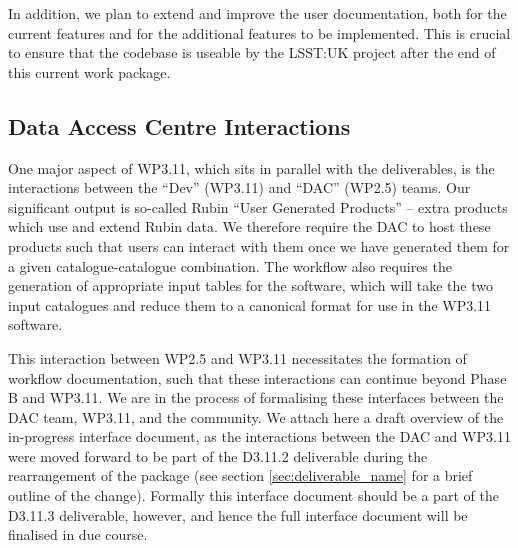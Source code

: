 \documentclass[a4paper,11pt]{scrartcl}
\begin{document}
In addition, we plan to extend and improve the user documentation, both for the current features and for the additional features to be implemented.
This is crucial to ensure that the codebase is useable by the LSST:UK project after the end of this current work package.

\subsection{Data Access Centre Interactions}
One major aspect of WP3.11, which sits in parallel with the deliverables, is the interactions between the ``Dev'' (WP3.11) and ``DAC'' (WP2.5) teams.
Our significant output is so-called Rubin ``User Generated Products'' -- extra products which use and extend Rubin data.
We therefore require the DAC to host these products such that users can interact with them once we have generated them for a given catalogue-catalogue combination.
The workflow also requires the generation of appropriate input tables for the software, which will take the two input catalogues and reduce them to a canonical format for use in the WP3.11 software.

This interaction between WP2.5 and WP3.11 necessitates the formation of workflow documentation, such that these interactions can continue beyond Phase B and WP3.11.
We are in the process of formalising these interfaces between the DAC team, WP3.11, and the community.
We attach here a draft overview of the in-progress interface document, as the interactions between the DAC and WP3.11 were moved forward to be part of the D3.11.2 deliverable during the rearrangement of the package (see section \ref{sec:deliverable_name} for a brief outline of the change).
Formally this interface document should be a part of the D3.11.3 deliverable, however, and hence the full interface document will be finalised in due course.


\end{document}
